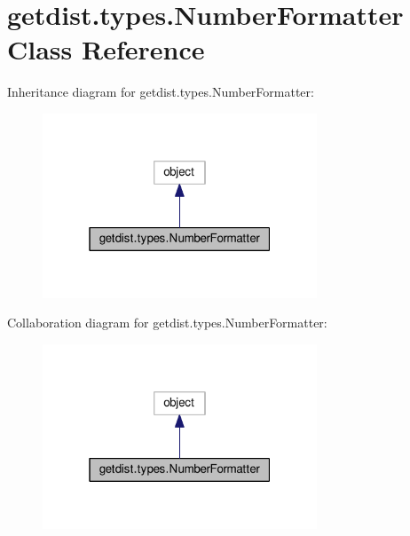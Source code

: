 \hypertarget{classgetdist_1_1types_1_1NumberFormatter}{}\section{getdist.\+types.\+Number\+Formatter Class Reference}
\label{classgetdist_1_1types_1_1NumberFormatter}


Inheritance diagram for getdist.\+types.\+Number\+Formatter\+:
\nopagebreak
\begin{figure}[H]
\begin{center}
\leavevmode
\includegraphics[width=232pt]{classgetdist_1_1types_1_1NumberFormatter__inherit__graph}
\end{center}
\end{figure}


Collaboration diagram for getdist.\+types.\+Number\+Formatter\+:
\nopagebreak
\begin{figure}[H]
\begin{center}
\leavevmode
\includegraphics[width=232pt]{classgetdist_1_1types_1_1NumberFormatter__coll__graph}
\end{center}
\end{figure}

